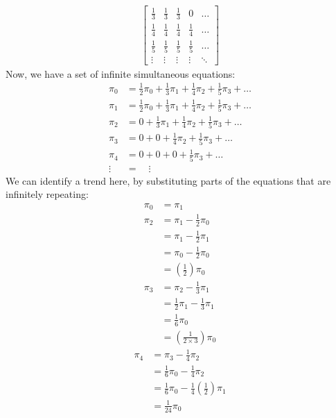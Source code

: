 \documentclass[12pt]{article}
\begin{document}
\begin{align*}
\begin{bmatrix}
            \frac{1}{3} & \frac{1}{3} & \frac{1}{3} & 0 & \dots \\
            \frac{1}{4} & \frac{1}{4} & \frac{1}{4} & \frac{1}{4} & \dots \\
            \frac{1}{5} & \frac{1}{5} & \frac{1}{5} & \frac{1}{5} & \dots \\
            \vdots & \vdots & \vdots & \vdots & \ddots 
    \end{bmatrix}
\end{align*} Now, we have a set of infinite simultaneous equations: \begin{align*}
    \pi_0 &= \frac{1}{2}\pi_0 + \frac{1}{3 }\pi_1 + \frac{1}{4}\pi_2 + \frac{1}{5}\pi_3 + \dots \\ 
    \pi_1 &= \frac{1}{2}\pi_0 + \frac{1}{3 }\pi_1 + \frac{1}{4}\pi_2 + \frac{1}{5}\pi_3 + \dots \\ 
    \pi_2 &= 0 + \frac{1}{3 }\pi_1 + \frac{1}{4}\pi_2 + \frac{1}{5}\pi_3 + \dots \\ 
    \pi_3 &= 0 + 0 + \frac{1}{4}\pi_2 + \frac{1}{5}\pi_3 + \dots \\ 
    \pi_4 &= 0 + 0 + 0 + \frac{1}{5}\pi_3 + \dots \\ 
    \vdots & =\quad \vdots
\end{align*} We can identify a trend here, by substituting parts of the equations that are infinitely repeating: \begin{align}
    \pi_0 &= \pi_1 \\ 
    \pi_2 &= \pi_1 - \frac{1}{2}\pi_0 \\ \nonumber
    &= \pi_1 - \frac{1}{2}\pi_1 \\ \nonumber
    &= \pi_0 - \frac{1}{2}\pi_0 \\ \nonumber
    &= \left( \frac{1}{2} \right)\pi_0 \\ 
    \pi_3 &= \pi_2 - \frac{1}{3}\pi_1 \\ \nonumber
    &= \frac{1}{2}\pi_1 - \frac{1}{3} \pi_1 \\ \nonumber
    &= \frac{1}{6}\pi_0 \\ \nonumber
    &= \left( \frac{1}{2 \times 3}\right)\pi_0 
\end{align} \begin{align}
    \pi_4 &= \pi_3 - \frac{1}{4}\pi_2 \\ \nonumber
    &= \frac{1}{6}\pi_0 - \frac{1}{4}\pi_2 \\ \nonumber
    &= \frac{1}{6}\pi_0 - \frac{1}{4}\left( \frac{1}{2} \right)\pi_1 \\ \nonumber
    &= \frac{1}{24} \pi_0 \\ \nonumber

\end{align}
\end{document}
